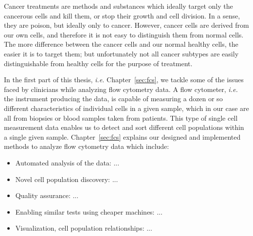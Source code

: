 Cancer treatments are methods and substances which ideally target only the
cancerous cells and kill them, or stop their growth and cell division. In a
sense, they are poison, but ideally only to cancer. However, cancer cells are
derived from our own cells, and therefore it is not easy to distinguish them
from normal cells. The more difference between the cancer cells and our normal
healthy cells, the easier it is to target them; but unfortunately not all
cancer subtypes are easily distinguishable from healthy cells for the purpose
of treatment.

In the first part of this thesis, \emph{i.e.} Chapter~\ref{sec:fcs}, we tackle
some of the issues faced by clinicians while analyzing flow cytometry data. A
flow cytometer, \emph{i.e.} the instrument producing the data, is capable of
measuring a dozen or so different characteristics of individual cells in a
given sample, which in our case are all from biopsies or blood samples taken
from patients. This type of single cell measurement data enables us to detect
and sort different cell populations within a single given sample.
Chapter~\ref{sec:fcs} explains our designed and implemented methods to analyze
flow cytometry data which include:

\begin{itemize}
  \item Automated analysis of the data: ...
  \item Novel cell population discovery: ...
  \item Quality assurance: ...
  \item Enabling similar tests using cheaper machines: ...
  \item Visualization, cell population relationships: ...
\end{itemize}

